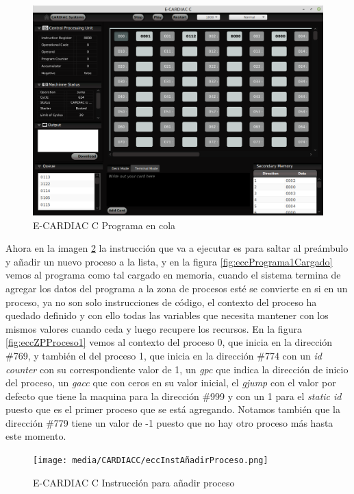 \documentclass[letterpaper,12pt,oneside]{book}
\begin{document}
			

		\begin{figure}[h]		
			\centering
			\includegraphics[scale=0.4]{media/CARDIACC/eccProgramaenCola.png}
			\caption{E-CARDIAC C Programa en cola}
			\label{fig:eccProgramaEnCola}
		\end{figure}	
		
		Ahora en la imagen \ref{fig:eccAddNewProcesInst} la instrucción que va a ejecutar es para saltar al preámbulo y añadir un nuevo proceso a la lista,
		y en la figura \ref{fig:eccPrograma1Cargado} vemos al programa como tal cargado en memoria, cuando el sistema termina de agregar los datos del
		programa a la zona de procesos esté se convierte en si en un proceso, ya no son solo instrucciones de código, el contexto del proceso ha quedado definido
		y con ello todas las variables que necesita mantener con los mismos valores cuando ceda y luego recupere los recursos. En la figura \ref{fig:eccZPProceso1}
		vemos al contexto del proceso 0, que inicia en la dirección \#769, y también el del proceso 1, que inicia en la dirección \#774 con un \textit{id counter}
		con su correspondiente valor de 1, un \textit{gpc} que indica la dirección de inicio del proceso, un \textit{gacc} que con ceros en su valor inicial,
		el \textit{gjump} con el valor por defecto que tiene la maquina para la dirección \#999 y con un 1 para el \textit{static id} puesto que es el primer 
		proceso que se está agregando. Notamos también que la dirección \#779 tiene un valor de -1 puesto que no hay otro proceso más hasta este momento.
		
		\begin{figure}[h]		
			\centering
			\texttt{[image: media/CARDIACC/eccInstAñadirProceso.png]}
			\caption{E-CARDIAC C Instrucción para añadir proceso}
			\label{fig:eccAddNewProcesInst}
		\end{figure}	
		
\end{document}
